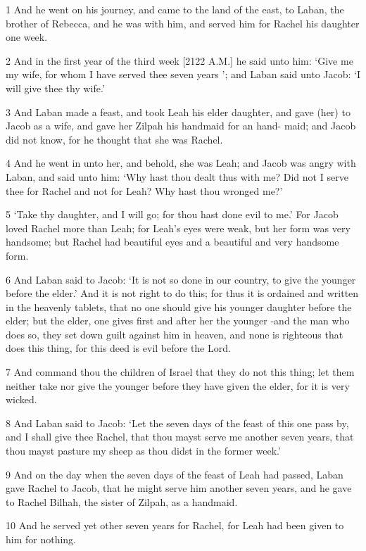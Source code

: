 \par 1 And he went on his journey, and came to the land of the east, to Laban, the brother of Rebecca, and he was with him, and served him for Rachel his daughter one week.
\par 2 And in the first year of the third week [2122 A.M.] he said unto him: ‘Give me my wife, for whom I have served thee seven years ’; and Laban said unto Jacob: ‘I will give thee thy wife.’
\par 3 And Laban made a feast, and took Leah his elder daughter, and gave (her) to Jacob as a wife, and gave her Zilpah his handmaid for an hand- maid; and Jacob did not know, for he thought that she was Rachel.
\par 4 And he went in unto her, and behold, she was Leah; and Jacob was angry with Laban, and said unto him: ‘Why hast thou dealt thus with me? Did not I serve thee for Rachel and not for Leah? Why hast thou wronged me?’
\par 5 ‘Take thy daughter, and I will go; for thou hast done evil to me.’ For Jacob loved Rachel more than Leah; for Leah's eyes were weak, but her form was very handsome; but Rachel had beautiful eyes and a beautiful and very handsome form.
\par 6 And Laban said to Jacob: ‘It is not so done in our country, to give the younger before the elder.’ And it is not right to do this; for thus it is ordained and written in the heavenly tablets, that no one should give his younger daughter before the elder; but the elder, one gives first and after her the younger -and the man who does so, they set down guilt against him in heaven, and none is righteous that does this thing, for this deed is evil before the Lord.
\par 7 And command thou the children of Israel that they do not this thing; let them neither take nor give the younger before they have given the elder, for it is very wicked.
\par 8 And Laban said to Jacob: ‘Let the seven days of the feast of this one pass by, and I shall give thee Rachel, that thou mayst serve me another seven years, that thou mayst pasture my sheep as thou didst in the former week.’
\par 9 And on the day when the seven days of the feast of Leah had passed, Laban gave Rachel to Jacob, that he might serve him another seven years, and he gave to Rachel Bilhah, the sister of Zilpah, as a handmaid.
\par 10 And he served yet other seven years for Rachel, for Leah had been given to him for nothing.
